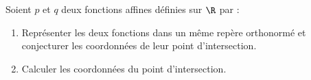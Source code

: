 \begin{exo}{}
	Soient $p$ et $q$ deux fonctions affines définies sur $\R$ par : 
	\begin{enumerate}
		\item Représenter les deux fonctions dans un même repère orthonormé et conjecturer les coordonnées de leur point d'intersection.
		\item Calculer les coordonnées du point d'intersection.
	\end{enumerate}
\end{exo}

